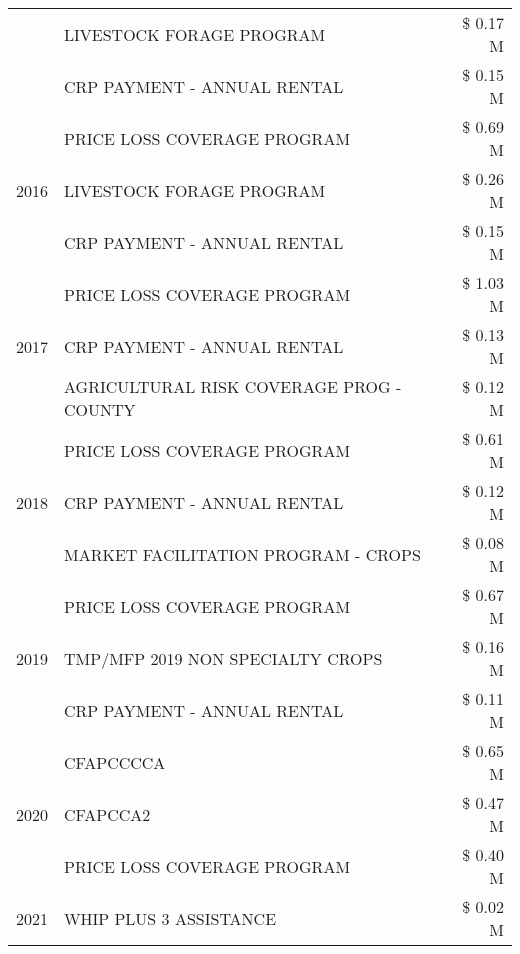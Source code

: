 \begin{tabular}{llr}
 & LIVESTOCK FORAGE PROGRAM & \$ 0.17 M \\
 & CRP PAYMENT - ANNUAL RENTAL & \$ 0.15 M \\
\cline{1-3}
\multirow[t]{3}{*}{2016} & PRICE LOSS COVERAGE PROGRAM & \$ 0.69 M \\
 & LIVESTOCK FORAGE PROGRAM & \$ 0.26 M \\
 & CRP PAYMENT - ANNUAL RENTAL & \$ 0.15 M \\
\cline{1-3}
\multirow[t]{3}{*}{2017} & PRICE LOSS COVERAGE PROGRAM & \$ 1.03 M \\
 & CRP PAYMENT - ANNUAL RENTAL & \$ 0.13 M \\
 & AGRICULTURAL RISK COVERAGE PROG - COUNTY & \$ 0.12 M \\
\cline{1-3}
\multirow[t]{3}{*}{2018} & PRICE LOSS COVERAGE PROGRAM & \$ 0.61 M \\
 & CRP PAYMENT - ANNUAL RENTAL & \$ 0.12 M \\
 & MARKET FACILITATION PROGRAM - CROPS & \$ 0.08 M \\
\cline{1-3}
\multirow[t]{3}{*}{2019} & PRICE LOSS COVERAGE PROGRAM & \$ 0.67 M \\
 & TMP/MFP 2019 NON SPECIALTY CROPS & \$ 0.16 M \\
 & CRP PAYMENT - ANNUAL RENTAL & \$ 0.11 M \\
\cline{1-3}
\multirow[t]{3}{*}{2020} & CFAPCCCCA & \$ 0.65 M \\
 & CFAPCCA2 & \$ 0.47 M \\
 & PRICE LOSS COVERAGE PROGRAM & \$ 0.40 M \\
\cline{1-3}
2021 & WHIP PLUS 3 ASSISTANCE & \$ 0.02 M \\
\cline{1-3}
\bottomrule
\end{tabular}
